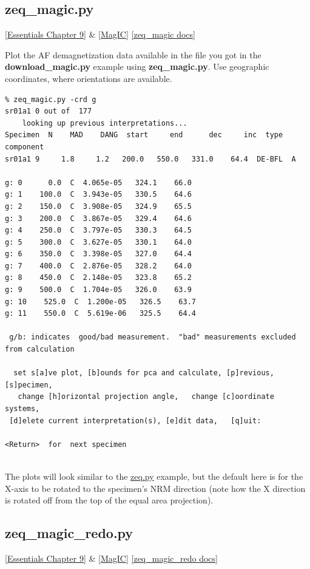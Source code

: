 \documentclass[11pt]{book}
\begin{document}
{{
\subsection{zeq\_magic.py}
\href{http://magician.ucsd.edu/Essentials_2/WebBook2ch9.html#ch9}{[Essentials Chapter 9]}  \& \href{#MagIC}{[MagIC]}
\href{http://earthref.org/PmagPy/pmagpydocs/zeq_magic-module.html}{[zeq\_magic docs]}


Plot the AF demagnetization data available in the file you got in the {\bf download\_magic.py} example using {\bf zeq\_magic.py}.    Use geographic coordinates, where orientations are available.  

\begin{verbatim}
% zeq_magic.py -crd g
sr01a1 0 out of  177
    looking up previous interpretations...
Specimen  N    MAD    DANG  start     end      dec     inc  type  component
sr01a1 9     1.8     1.2   200.0   550.0   331.0    64.4  DE-BFL  A 

g: 0      0.0  C  4.065e-05   324.1    66.0 
g: 1    100.0  C  3.943e-05   330.5    64.6 
g: 2    150.0  C  3.908e-05   324.9    65.5 
g: 3    200.0  C  3.867e-05   329.4    64.6 
g: 4    250.0  C  3.797e-05   330.3    64.5 
g: 5    300.0  C  3.627e-05   330.1    64.0 
g: 6    350.0  C  3.398e-05   327.0    64.4 
g: 7    400.0  C  2.876e-05   328.2    64.0 
g: 8    450.0  C  2.148e-05   323.8    65.2 
g: 9    500.0  C  1.704e-05   326.0    63.9 
g: 10    525.0  C  1.200e-05   326.5    63.7 
g: 11    550.0  C  5.619e-06   325.5    64.4 

 g/b: indicates  good/bad measurement.  "bad" measurements excluded from calculation

  set s[a]ve plot, [b]ounds for pca and calculate, [p]revious, [s]pecimen, 
   change [h]orizontal projection angle,   change [c]oordinate systems, 
 [d]elete current interpretation(s), [e]dit data,   [q]uit: 
                
<Return>  for  next specimen 


\end{verbatim}

The plots will look similar to the \href{#zeq.py}{zeq.py} example, but the default here is for the X-axis to be rotated to the specimen's NRM direction (note how the X direction is rotated off from the top of the equal area projection).   



\subsection{zeq\_magic\_redo.py}
\href{http://magician.ucsd.edu/Essentials_2/WebBook2ch9.html#ch9}{[Essentials Chapter 9]}  \& \href{#MagIC}{[MagIC]}
\href{http://earthref.org/PmagPy/pmagpydocs/zeq_magic_redo-module.html}{[zeq\_magic\_redo docs]}

}}
\end{document}
